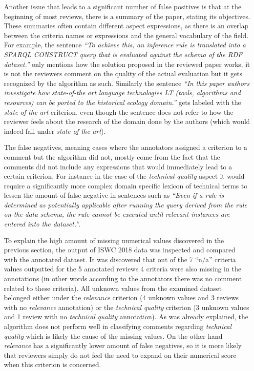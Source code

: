 Another issue that leads to a significant number of false positives is that at the beginning of most reviews, there is a summary of the paper, stating its objectives. These summaries often contain different aspect expressions, as there is an overlap between the criteria names or expressions and the general vocabulary of the field. 
For example, the sentence \textit{``To achieve this, an inference rule is translated into a SPARQL CONSTRUCT query that is evaluated against the schema of the RDF dataset.''} only mentions how the solution proposed in the reviewed paper works, it is not the reviewers comment on the quality of the actual evaluation but it gets recognized by the algorithm as such. Similarly the sentence \textit{``In this paper authors investigate how state-of-the art language technologies LT (tools, algorithms and resources) can be ported to the historical ecology domain.''} gets labeled with the \textit{state of the art} criterion, even though the sentence does not refer to how the reviewer feels about the research of the domain done by the authors (which would indeed fall under \textit{state of the art}). 

The false negatives, meaning cases where the annotators assigned a criterion to a comment but the algorithm did not, mostly come from the fact that the comments did not include any expressions that would immediately lead to a certain criterion. For instance in the case of the \textit{technical quality} aspect it would require a significantly more complex domain specific lexicon of technical terms to lessen the amount of false negative in sentences such as \textit{``Even if a rule is determined as potentially applicable after running the query derived from the rule on the data schema, the rule  cannot be executed until relevant instances are entered into the dataset.''}.

To explain the high amount of missing numerical values discovered in the previous section, the output of ISWC 2018 data was inspected and compared with the annotated dataset. It was discovered that out of the  7 ``n/a'' criteria values outputted for the 5 annotated reviews 4 criteria were also missing in the annotations (in other words according to the annotators there was no comment related to these criteria). All unknown values from the examined dataset belonged either under the \textit{relevance} criterion (4 unknown values and 3 reviews with no \textit{relevance} annotation) or the \textit{technical quality} criterion (3 unknown values and 1 review with no \textit{technical quality} annotation). As was already explained, the algorithm does not perform well in classifying comments regarding \textit{technical quality} which is likely the cause of the missing values. On the other hand \textit{relevance} has a significantly lower amount of false negatives, so it is more likely that reviewers simply do not feel the need to expand on their numerical score when this criterion is concerned.


